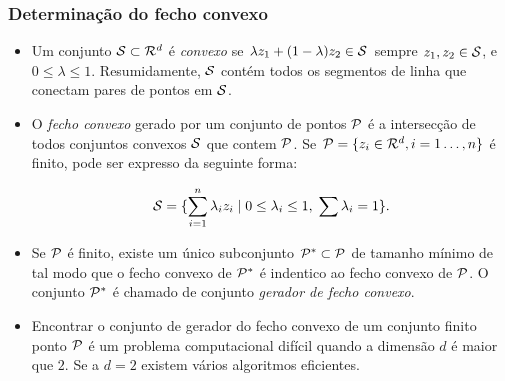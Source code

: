 \documentclass[12pt]{article}
\begin{document}
\subsubsection{Determinação do fecho convexo}
\begin{itemize}

\item Um conjunto ${\cal S} \subset {\cal R}^d$ é {\em convexo} se $\lambda
z_1 + (1-\lambda)z_2 \in {\cal S}$ sempre $z_1, z_2 \in{\cal S}$,
e $0 \le \lambda \le 1$. Resumidamente, ${\cal S}$ contém todos os segmentos de linha que conectam pares de pontos em ${\cal S}$.

\item O {\em fecho convexo} gerado por um conjunto de pontos ${\cal P}$ é
a intersecção de todos conjuntos convexos ${\cal S}$ que contem ${\cal P}$.
Se ${\cal P} = \{z_i\in{\cal R}^d, i=1\ldots, n\}$ é finito, pode ser expresso da seguinte forma:

$${\cal S} = \{ \sum_{i=1}^n \lambda_i z_i \;|\; 0 \le \lambda_i \le
1, \; \sum \lambda_i = 1\}.$$

\begin{center}
\end{center}

\item Se ${\cal P}$ é finito, existe um único subconjunto ${\cal
P}^* \subset {\cal P}$ de tamanho mínimo de tal modo que o fecho convexo de
${\cal P}^*$ é indentico ao fecho convexo de ${\cal P}$.  O conjunto
${\cal P}^*$ é chamado de conjunto {\em gerador de fecho convexo}.

\item Encontrar o conjunto de gerador do fecho convexo de um conjunto finito ponto
${\cal P}$ é um problema computacional difícil quando a dimensão $d$
é maior que $2$.  Se a $d = 2$ existem vários algoritmos eficientes.
\end{itemize}
\end{document}
